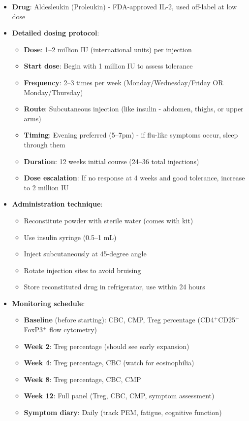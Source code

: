 \begin{itemize}
    \item \textbf{Drug}: Aldesleukin (Proleukin) - FDA-approved IL-2, used off-label at low dose

    \item \textbf{Detailed dosing protocol}:
    \begin{itemize}
        \item \textbf{Dose}: 1--2 million IU (international units) per injection
        \item \textbf{Start dose}: Begin with 1 million IU to assess tolerance
        \item \textbf{Frequency}: 2--3 times per week (Monday/Wednesday/Friday OR Monday/Thursday)
        \item \textbf{Route}: Subcutaneous injection (like insulin - abdomen, thighs, or upper arms)
        \item \textbf{Timing}: Evening preferred (5--7pm) - if flu-like symptoms occur, sleep through them
        \item \textbf{Duration}: 12 weeks initial course (24--36 total injections)
        \item \textbf{Dose escalation}: If no response at 4 weeks and good tolerance, increase to 2 million IU
    \end{itemize}

    \item \textbf{Administration technique}:
    \begin{itemize}
        \item Reconstitute powder with sterile water (comes with kit)
        \item Use insulin syringe (0.5--1 mL)
        \item Inject subcutaneously at 45-degree angle
        \item Rotate injection sites to avoid bruising
        \item Store reconstituted drug in refrigerator, use within 24 hours
    \end{itemize}

    \item \textbf{Monitoring schedule}:
    \begin{itemize}
        \item \textbf{Baseline} (before starting): CBC, CMP, Treg percentage (CD4$^+$CD25$^+$FoxP3$^+$ flow cytometry)
        \item \textbf{Week 2}: Treg percentage (should see early expansion)
        \item \textbf{Week 4}: Treg percentage, CBC (watch for eosinophilia)
        \item \textbf{Week 8}: Treg percentage, CBC, CMP
        \item \textbf{Week 12}: Full panel (Treg, CBC, CMP, symptom assessment)
        \item \textbf{Symptom diary}: Daily (track PEM, fatigue, cognitive function)
    \end{itemize}


\end{itemize}
